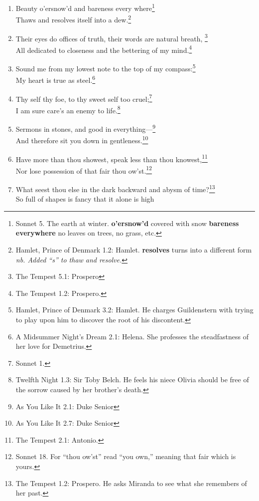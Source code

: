 \documentclass[17pt,twoside]{extarticle}
\begin{document}
\begin{enumerate}
  wheel!\footnote{King Lear 2.2: Kent. He has been put in stocks by
    Cornwall and Regan, Lear's daughter. \textbf{Fortune} goddess of
    luck \textbf{smile} bring me good luck \textbf{thy} your
    \textbf{wheel} Fortune's wheel, which brings luck, misfortune, or
    neither.}
\item
  Beauty o'ersnow'd and bareness every where\footnote{Sonnet 5. The
    earth at winter. \textbf{o'ersnow'd} covered with snow
    \textbf{bareness everywhere} no leaves on trees, no grass, etc.}\\Thaws
  and resolves itself into a dew.\footnote{Hamlet, Prince of Denmark
    1.2: Hamlet. \textbf{resolves} turns into a different form \emph{nb.
    Added ``s'' to thaw and resolve.}}
\item
  Their eyes do offices of truth, their words are natural breath,
  \footnote{The Tempest 5.1: Prospero}\\All dedicated to closeness and
  the bettering of my mind.\footnote{The Tempest 1.2: Prospero.}
\item
  Sound me from my lowest note to the top of my compass:\footnote{Hamlet,
    Prince of Denmark 3.2: Hamlet. He charges Guildenstern with trying
    to play upon him to discover the root of his discontent.}\\My heart
  is true as steel.\footnote{A Midsummer Night's Dream 2.1: Helena. She
    professes the steadfastness of her love for Demetrius.}
\item
  Thy self thy foe, to thy sweet self too cruel;\footnote{Sonnet 1.}\\I
  am sure care's an enemy to life.\footnote{Twelfth Night 1.3: Sir Toby
    Belch. He feels his niece Olivia should be free of the sorrow caused
    by her brother's death.}
\item
  Sermons in stones, and good in everything---\footnote{As You Like It
    2.1: Duke Senior}\\And therefore sit you down in
  gentleness.\footnote{As You Like It 2.7: Duke Senior}
\item
  Have more than thou showest, speak less than thou knowest,\footnote{The
    Tempest 2.1: Antonio.}\\Nor lose possession of that fair thou
  ow'st.\footnote{Sonnet 18. For ``thou ow'st'' read ``you own,''
    meaning that fair which is yours.}
\item
  What seest thou else in the dark backward and abysm of time?\footnote{The
    Tempest 1.2: Prospero. He asks Miranda to see what she remembers of
    her past.}\\So full of shapes is fancy that it alone is high

\end{enumerate}
\end{document}

